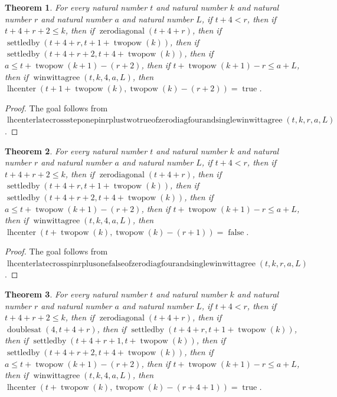 \documentclass[11pt]{article}
\newtheorem{theorem}{Theorem}[section]
\theoremstyle{definition}
\begin{document}
\begin{theorem}
\label{ll:paper:lhcenter-late-cross-step-one-pin-r-plus-two-true-of-zero-diag-four-and-single-winwittagree}
For every natural number \(t\) and natural number \(k\) and natural number \(r\) and natural number \(a\) and natural number \(L\), if \(t + 4 < r\), then if \(t + 4 + r + 2 \le k\), then if \(\operatorname{zerodiagonal}(t + 4 + r)\), then if \(\operatorname{settledby}(t + 4 + r, t + 1 + \operatorname{twopow}(k))\), then if \(\operatorname{settledby}(t + 4 + r + 2, t + 4 + \operatorname{twopow}(k))\), then if \(a \le t + \operatorname{twopow}(k + 1) - (r + 2)\), then if \(t + \operatorname{twopow}(k + 1) - r \le a + L\), then if \(\operatorname{winwittagree}(t, k, 4, a, L)\), then \(\operatorname{lhcenter}(t + 1 + \operatorname{twopow}(k), \operatorname{twopow}(k) - (r + 2)) = \operatorname{true}\).
\end{theorem}
\begin{proof}
The goal follows from \(\operatorname{lhcenterlatecrosssteponepinrplustwotrueofzerodiagfourandsinglewinwittagree}(t, k, r, a, L)\).
\end{proof}
\begin{theorem}
\label{ll:paper:lhcenter-late-cross-pin-r-plus-one-false-of-zero-diag-four-and-single-winwittagree}
For every natural number \(t\) and natural number \(k\) and natural number \(r\) and natural number \(a\) and natural number \(L\), if \(t + 4 < r\), then if \(t + 4 + r + 2 \le k\), then if \(\operatorname{zerodiagonal}(t + 4 + r)\), then if \(\operatorname{settledby}(t + 4 + r, t + 1 + \operatorname{twopow}(k))\), then if \(\operatorname{settledby}(t + 4 + r + 2, t + 4 + \operatorname{twopow}(k))\), then if \(a \le t + \operatorname{twopow}(k + 1) - (r + 2)\), then if \(t + \operatorname{twopow}(k + 1) - r \le a + L\), then if \(\operatorname{winwittagree}(t, k, 4, a, L)\), then \(\operatorname{lhcenter}(t + \operatorname{twopow}(k), \operatorname{twopow}(k) - (r + 1)) = \operatorname{false}\).
\end{theorem}
\begin{proof}
The goal follows from \(\operatorname{lhcenterlatecrosspinrplusonefalseofzerodiagfourandsinglewinwittagree}(t, k, r, a, L)\).
\end{proof}
\begin{theorem}
\label{ll:paper:lhcenter-late-cross-pin-doubling-diag-true-of-doubles-four-and-single-winwittagree}
For every natural number \(t\) and natural number \(k\) and natural number \(r\) and natural number \(a\) and natural number \(L\), if \(t + 4 < r\), then if \(t + 4 + r + 2 \le k\), then if \(\operatorname{zerodiagonal}(t + 4 + r)\), then if \(\operatorname{doublesat}(4, t + 4 + r)\), then if \(\operatorname{settledby}(t + 4 + r, t + 1 + \operatorname{twopow}(k))\), then if \(\operatorname{settledby}(t + 4 + r + 1, t + \operatorname{twopow}(k))\), then if \(\operatorname{settledby}(t + 4 + r + 2, t + 4 + \operatorname{twopow}(k))\), then if \(a \le t + \operatorname{twopow}(k + 1) - (r + 2)\), then if \(t + \operatorname{twopow}(k + 1) - r \le a + L\), then if \(\operatorname{winwittagree}(t, k, 4, a, L)\), then \(\operatorname{lhcenter}(t + \operatorname{twopow}(k), \operatorname{twopow}(k) - (r + 4 + 1)) = \operatorname{true}\).
\end{theorem}
\end{document}
